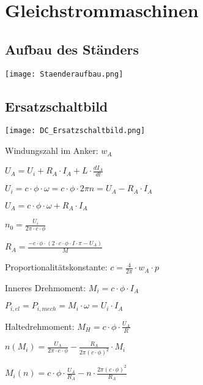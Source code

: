 \documentclass[german]{latex4ei/latex4ei_sheet}
\begin{document}
	\section{Gleichstrommaschinen}
		\begin{sectionbox}
			\subsection{Aufbau des Ständers}
				\texttt{[image: Staenderaufbau.png]}
			\subsection{Ersatzschaltbild}
				\texttt{[image: DC\_Ersatzschaltbild.png]}
				\begin{symbolbox}
					\item Windungszahl im Anker: $w_A$
					\item $U_A = U_i +R_A\cdot I_A+L\cdot \frac{dI_A}{dt}$
					\item $U_i = c\cdot \phi \cdot \omega = c \cdot \phi \cdot 2\pi n = U_A - R_A\cdot I_A$
					\item $U_A = c\cdot \phi \cdot \omega +R_A\cdot I_A$
					\item $n_0 = \frac{U_i}{2\pi\cdot c\cdot \phi}$
					\item $R_A = \frac{-c\cdot \phi\cdot (2\cdot c\cdot \phi \cdot I\cdot \pi - U_A)}{M}$
					\item Proportionalitätskonstante: $c =\frac{4}{2\pi}\cdot w_A\cdot p$
					\item Inneres Drehmoment: $M_i = c\cdot \phi \cdot I_A$
					\item $ P_{i, el} = P_{i, mech} = M_i \cdot \omega = U_i\cdot I_A$
					\item Haltedrehmoment: $M_H = c\cdot \phi \cdot \frac{U_A}{R}$
					\item $n(M_i) = \frac{U_A}{2\pi\cdot c\cdot \phi}-\frac{R_A}{2\pi(c\cdot \phi)^2}\cdot M_i$
					\item $M_i(n) = c\cdot \phi\cdot \frac{U_A}{R_A}-n\cdot \frac{2\pi(c\cdot \phi)^2}{R_A}$
				\end{symbolbox}
		\end{sectionbox}
	
\end{document}
